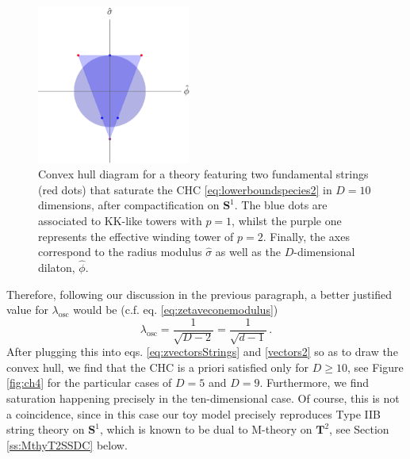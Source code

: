 \begin{figure}[htb]
\begin{center}
\includegraphics[width=0.45\textwidth]{CH-3.pdf}
\caption{\small Convex hull diagram for a theory featuring two fundamental strings (red dots) that saturate the CHC \eqref{eq:lowerboundspecies2} in $D=10$ dimensions, after compactification on $\mathbf{S}^1$. The blue dots are associated to KK-like towers with $p=1$, whilst the purple one represents the effective winding tower of $p=2$. Finally, the axes correspond to the radius modulus $\hat \sigma$ as well as the $D$-dimensional dilaton, $\hat \phi$.} 
\label{fig:ch3}
\end{center}
\end{figure}

Therefore, following our discussion in the previous paragraph, a better justified value for $\lambda_{\text{osc}}$ would be (c.f. eq. \eqref{eq:zetaveconemodulus})
%
\begin{equation}
    \lambda_{\text{osc}} = \frac{1}{\sqrt{D-2}} = \frac{1}{\sqrt{d-1}} \, .
\end{equation}
%
After plugging this into eqs. \eqref{eq:zvectorsStrings} and \eqref{vectors2} so as to draw the convex hull, we find that the CHC is a priori satisfied only for $D \geq 10$, see Figure \ref{fig:ch4} for the particular cases of $D=5$ and $D=9$. Furthermore, we find saturation happening precisely in the ten-dimensional case. %
Of course, this is not a coincidence, since in this case our toy model precisely reproduces Type IIB string theory on $\mathbf{S}^1$, which is known to be dual to M-theory on $\mathbf{T}^2$, see Section \ref{ss:MthyT2SSDC} below.

